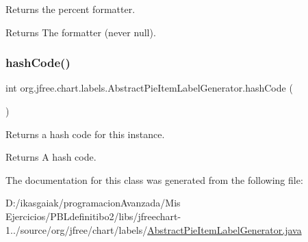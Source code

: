 Returns the percent formatter.

\begin{DoxyReturn}{Returns}
The formatter (never {\ttfamily null}). 
\end{DoxyReturn}
\mbox{\label{classorg_1_1jfree_1_1chart_1_1labels_1_1_abstract_pie_item_label_generator_ade858196c29fc2515d17c1f662931e2b}} 
\subsubsection{\texorpdfstring{hash\+Code()}{hashCode()}}
{\footnotesize\ttfamily int org.\+jfree.\+chart.\+labels.\+Abstract\+Pie\+Item\+Label\+Generator.\+hash\+Code (\begin{DoxyParamCaption}{ }\end{DoxyParamCaption})}

Returns a hash code for this instance.

\begin{DoxyReturn}{Returns}
A hash code. 
\end{DoxyReturn}


The documentation for this class was generated from the following file\+:\begin{DoxyCompactItemize}
\item 
D\+:/ikasgaiak/programacion\+Avanzada/\+Mis Ejercicios/\+P\+B\+Ldefinitibo2/libs/jfreechart-\/1../source/org/jfree/chart/labels/\mbox{\hyperlink{_abstract_pie_item_label_generator_8java}{Abstract\+Pie\+Item\+Label\+Generator.\+java}}\end{DoxyCompactItemize}
